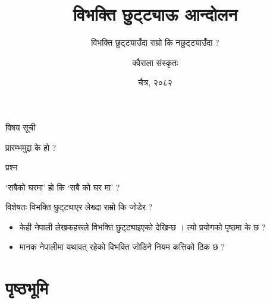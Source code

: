 \documentclass[aspectratio=169, 12pt]{beamer}
\title{#1}
\subtitle{#2}
\author{#3}
\date{#4}
\newcommand{\maketitleframe}[4]{
    \title{#1}
    \subtitle{#2}
    \author{#3}
    \date{#4}
    \begin{frame}
        \titlepage
    \end{frame}
}
\begin{document}
\maketitleframe{विभक्ति छुट्ट्याऊ आन्दोलन}{विभक्ति छुट्ट्याउँदा राम्रो कि नछुट्ट्याउँदा ?}{क्वैराला संस्कृतः}{चैत्र, २०८२}

\begin{frame}{विषय सूची}\tableofcontents\end{frame}

\begin{frame}[fragile]{प्रारम्भ}{मुद्दा के हो ?}

\begin{alertblock}{प्रश्न}

`सबैको घरमा' हो कि `सबै को घर मा' ?

विशेषतः विभक्ति छुट्ट्याएर लेख्दा राम्रो कि जोडेर ?

\end{alertblock}

\begin{itemize}
\item केही नेपाली लेखकहरूले विभक्ति छुट्ट्याइएको देखिन्छ । त्यो प्रयोगको पृष्ठमा के छ ?


\item मानक नेपालीमा यथावत् रहेको विभक्ति जोडिने नियम कत्तिको ठिक छ ?


\end{itemize}
\end{frame}

\section{पृष्ठभूमि}
\end{document}
